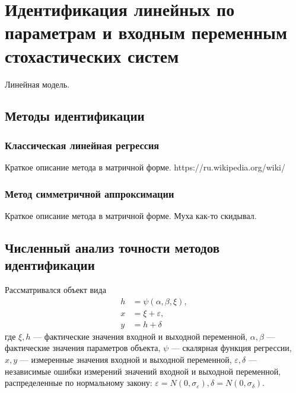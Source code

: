\chapter[Идентификация линейных по параметрам и \\ входным переменным стохастических систем]{%
  Идентификация линейных по параметрам и
  входным переменным стохастических систем
}

Линейная модель.

\section{Методы идентификации}

\subsection{Классическая линейная регрессия}

Краткое описание метода в матричной форме.
https://ru.wikipedia.org/wiki/%

\newpage
\subsection{Метод симметричной аппроксимации}

Краткое описание метода в матричной форме.
Муха как-то скидывал.

\section{Численный анализ точности методов идентификации}

Рассматривался объект вида
\begin{equation}
  \label{eq:model}
  \begin{aligned}
  h &= \psi (\alpha, \beta, \xi), \\
  x &= \xi + \varepsilon, \\
  y &= h + \delta
  \end{aligned}
\end{equation}
где
\( \xi, h \) --- фактические значения входной и выходной переменной,
\( \alpha, \beta \) --- фактические значения параметров объекта,
\( \psi \) --- скалярная функция регрессии,
\( x, y \) --- измеренные значения входной и выходной переменной,
\( \varepsilon, \delta \) --- независимые ошибки измерений значений входной и выходной переменной,
распределенные по нормальному закону:
\( \varepsilon = N(0, \sigma_{\varepsilon}), \delta = N(0, \sigma_{\delta}) \).

